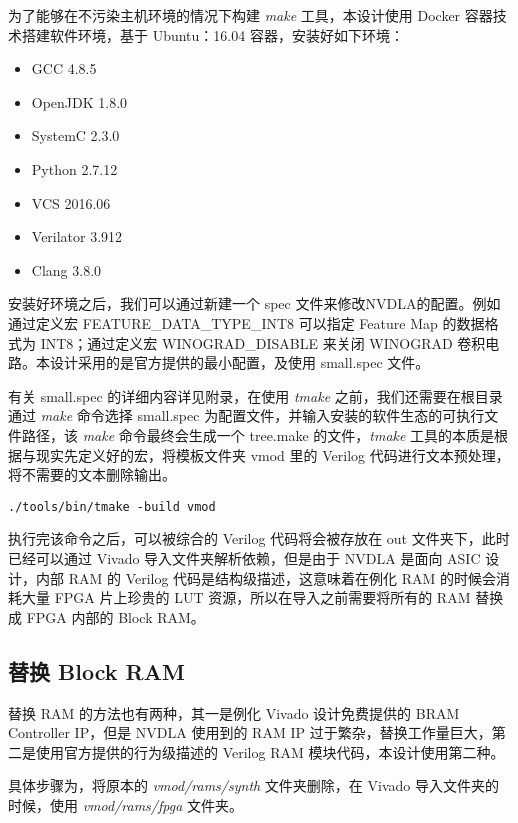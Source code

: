为了能够在不污染主机环境的情况下构建 \emph{make} 工具，本设计使用 Docker 容器技术搭建软件环境，基于 Ubuntu：16.04 容器，安装好如下环境：

\begin{itemize}
    \item GCC 4.8.5
    \item OpenJDK 1.8.0
    \item SystemC 2.3.0
    \item Python 2.7.12
    \item VCS 2016.06
    \item Verilator 3.912
    \item Clang 3.8.0
\end{itemize}

安装好环境之后，我们可以通过新建一个 spec 文件来修改NVDLA的配置。例如通过定义宏 FEATURE\_DATA\_TYPE\_INT8 可以指定 Feature Map 的数据格式为 INT8；通过定义宏 WINOGRAD\_DISABLE 来关闭 WINOGRAD 卷积电路。本设计采用的是官方提供的最小配置，及使用 small.spec 文件。

有关 small.spec 的详细内容详见附录，在使用 \emph{tmake} 之前，我们还需要在根目录通过 \emph{make} 命令选择 small.spec 为配置文件，并输入安装的软件生态的可执行文件路径，该 \emph{make} 命令最终会生成一个 tree.make 的文件，\emph{tmake} 工具的本质是根据与现实先定义好的宏，将模板文件夹 vmod 里的 Verilog 代码进行文本预处理，将不需要的文本删除输出。

\begin{lstlisting}
./tools/bin/tmake -build vmod
\end{lstlisting}

执行完该命令之后，可以被综合的 Verilog 代码将会被存放在 out 文件夹下，此时已经可以通过 Vivado 导入文件夹解析依赖，但是由于 NVDLA 是面向 ASIC 设计，内部 RAM 的 Verilog 代码是结构级描述，这意味着在例化 RAM 的时候会消耗大量 FPGA 片上珍贵的 LUT 资源，所以在导入之前需要将所有的 RAM 替换成 FPGA 内部的 Block RAM。

\subsection{替换 Block RAM}

替换 RAM 的方法也有两种，其一是例化 Vivado 设计免费提供的 BRAM Controller IP，但是 NVDLA 使用到的 RAM IP 过于繁杂，替换工作量巨大，第二是使用官方提供的行为级描述的 Verilog RAM 模块代码，本设计使用第二种。

具体步骤为，将原本的 \emph{vmod/rams/synth} 文件夹删除，在 Vivado 导入文件夹的时候，使用 \emph{vmod/rams/fpga} 文件夹。

